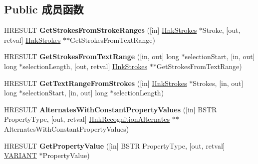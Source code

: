\subsection*{Public 成员函数}
\begin{DoxyCompactItemize}
\item 
\mbox{\label{interface_m_s_i_n_k_a_u_t_lib_1_1_i_ink_recognition_alternate_ace79c09c119b0360fdc420d924694d62}} 
H\+R\+E\+S\+U\+LT {\bfseries Get\+Strokes\+From\+Stroke\+Ranges} (\mbox{[}in\mbox{]} \hyperlink{interface_m_s_i_n_k_a_u_t_lib_1_1_i_ink_strokes}{I\+Ink\+Strokes} $\ast$Stroke, \mbox{[}out, retval\mbox{]} \hyperlink{interface_m_s_i_n_k_a_u_t_lib_1_1_i_ink_strokes}{I\+Ink\+Strokes} $\ast$$\ast$Get\+Strokes\+From\+Text\+Range)
\item 
\mbox{\label{interface_m_s_i_n_k_a_u_t_lib_1_1_i_ink_recognition_alternate_a88cd04cab2a5eeb1312587513ad0db52}} 
H\+R\+E\+S\+U\+LT {\bfseries Get\+Strokes\+From\+Text\+Range} (\mbox{[}in, out\mbox{]} long $\ast$selection\+Start, \mbox{[}in, out\mbox{]} long $\ast$selection\+Length, \mbox{[}out, retval\mbox{]} \hyperlink{interface_m_s_i_n_k_a_u_t_lib_1_1_i_ink_strokes}{I\+Ink\+Strokes} $\ast$$\ast$Get\+Strokes\+From\+Text\+Range)
\item 
\mbox{\label{interface_m_s_i_n_k_a_u_t_lib_1_1_i_ink_recognition_alternate_af40f55c0246419901eebc1dbc7be2b1d}} 
H\+R\+E\+S\+U\+LT {\bfseries Get\+Text\+Range\+From\+Strokes} (\mbox{[}in\mbox{]} \hyperlink{interface_m_s_i_n_k_a_u_t_lib_1_1_i_ink_strokes}{I\+Ink\+Strokes} $\ast$Strokes, \mbox{[}in, out\mbox{]} long $\ast$selection\+Start, \mbox{[}in, out\mbox{]} long $\ast$selection\+Length)
\item 
\mbox{\label{interface_m_s_i_n_k_a_u_t_lib_1_1_i_ink_recognition_alternate_acbf3690ee17f283b18759858cafc1b1b}} 
H\+R\+E\+S\+U\+LT {\bfseries Alternates\+With\+Constant\+Property\+Values} (\mbox{[}in\mbox{]} B\+S\+TR Property\+Type, \mbox{[}out, retval\mbox{]} \hyperlink{interface_m_s_i_n_k_a_u_t_lib_1_1_i_ink_recognition_alternates}{I\+Ink\+Recognition\+Alternates} $\ast$$\ast$Alternates\+With\+Constant\+Property\+Values)
\item 
\mbox{\label{interface_m_s_i_n_k_a_u_t_lib_1_1_i_ink_recognition_alternate_a14745ce09735f61e2977b5b43d089d79}} 
H\+R\+E\+S\+U\+LT {\bfseries Get\+Property\+Value} (\mbox{[}in\mbox{]} B\+S\+TR Property\+Type, \mbox{[}out, retval\mbox{]} \hyperlink{structtag_v_a_r_i_a_n_t}{V\+A\+R\+I\+A\+NT} $\ast$Property\+Value)
\end{DoxyCompactItemize}
